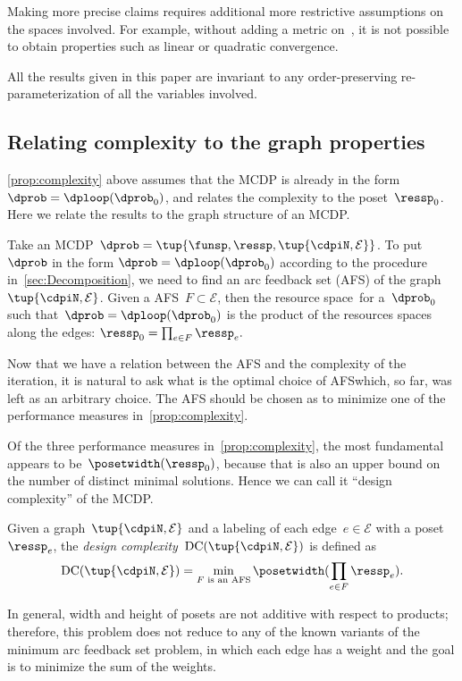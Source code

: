 \begin{remark}
  Making more precise claims requires additional more restrictive assumptions
  on the spaces involved. For example, without adding a metric on~\ressp,
  it is not possible to obtain properties such as linear or quadratic
  convergence.
\end{remark}

\begin{remark}
  All the results given in this paper are invariant to any order-preserving
  re-parameterization of all the variables involved.
\end{remark}

\subsection{Relating complexity to the graph properties}

\cref{prop:complexity} above assumes that the MCDP is already in the form $\dprob=\dploop(\dprob_{0})$, and relates the complexity to
the poset~$\ressp_{0}$.
Here we relate the results to the graph structure of an MCDP.

Take an MCDP~$\dprob=\tup{ \funsp,\ressp,\tup{ \cdpiN,\mathcal{E}} } $.
To put~$\dprob$ in the form $\dprob=\dploop(\dprob_{0})$ according
to the procedure in~\cref{sec:Decomposition}, we need to find an arc
feedback set (AFS) of the graph~$\tup{ \cdpiN,\mathcal{E}} $.
Given a AFS~$F\subset\mathcal{E}$, then the resource space~\ressp for a~$\dprob_{0}$ such that~$\dprob=\dploop(\dprob_{0})$ is the product of the resources spaces along the edges: $\ressp_{0}=\prod_{e\in F}\ressp_{e}.$

Now that we have a relation between the AFS and the complexity of the iteration, it is natural to ask what is the optimal choice of AFS\textemdash which, so far, was left as an arbitrary choice.
The AFS should be chosen as to minimize one of the performance measures in~\cref{prop:complexity}.

Of the three performance measures in~\cref{prop:complexity}, the most fundamental appears to be~$\posetwidth(\ressp_{0})$, because that is also an upper bound on the number of distinct minimal solutions.
Hence we can call it ``design complexity'' of the MCDP.
\begin{definition}
  \label{def:design-complexity}Given a graph~$\tup{ \cdpiN,\mathcal{E}} $
  and a labeling of each edge~$e\in\mathcal{E}$ with a poset~$\ressp_{e}$,
  the \emph{design complexity~}$\text{DC}(\tup{ \cdpiN,\mathcal{E}} )$
  is defined as
  \begin{equation}
    \text{DC}(\tup{ \cdpiN,\mathcal{E}} )=\min_{F\text{ is an AFS}}\posetwidth(\prod_{e\in F}\ressp_{e}).\label{eq:complexity}
  \end{equation}
\end{definition}
In general, width and height of posets are not additive with respect
to products; therefore, this problem does not reduce to any of the
known variants of the minimum arc feedback set problem, in which
each edge has a weight and the goal is to minimize the sum of the
weights.

